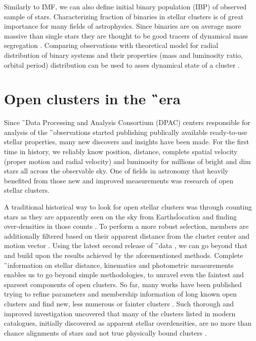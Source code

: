 Similarly to IMF, we can also define initial binary population (IBP) of observed sample of stars. Characterizing fraction of binaries in stellar clusters is of great importance for many fields of astrophysics. Since binaries are on average more massive than single stars they are thought to be good tracers of dynamical mass segregation \cite{2015arXiv151000099D}. Comparing observations with theoretical model for radial distribution of binary systems and their properties (mass and luminosity ratio, orbital period) distribution can be used to asses dynamical state of a cluster \cite{1999NewA....4..495K}.

\section{Open clusters in the \G\ era}
\label{sec:open_clust_gaia}
Since \G\ Data Processing and Analysis Consortium (DPAC) centers responsible for analysis of the \G\ observations started publishing publically available ready-to-use stellar properties, many new discovers and insights have been made. For the first time in history, we reliably know position, distance, complete spatial velocity (proper motion and radial velocity) and luminosity for millions of bright and dim stars all across the observable sky. One of fields in astronomy that heavily benefited from those new and improved measurements was research of open stellar clusters.

A traditional historical way to look for open stellar clusters was through counting stars as they are apparently seen on the sky from Earths\' location and finding over-densities in those counts \cite{1988AJ.....95..108L, 2014A&A...568A..51S}. To perform a more robust selection, members are additionally filtered based on their apparent distance from the cluster center and motion vector \cite{2017A&A...601A..19G}. Using the latest second release of \G\ data \citep[DR2,][]{2018arXiv180409365G}, we can go beyond that and build upon the results achieved by the aforementioned methods. Complete \G\ information on stellar distance, kinematics and photometric measurements enables us to go beyond simple methodologies, to unravel even the faintest and sparsest components of open clusters. So far, many works have been published trying to refine parameters and membership information of long known open clusters \cite{2017A&A...601A..19G, 2018A&A...618A..93C, 2019A&A...627A..35C} and find new, less numerous or fainter clusters \cite{2019arXiv190904612B, 2019ApJS..245...32L, 2019JKAS...52..145S, 2019A&A...624A.126C, 2020arXiv200107122C}. Such thorough and improved investigation uncovered that many of the clusters listed in modern catalogues, initially discovered as apparent stellar overdensities, are no more than chance alignments of stars and not true physically bound clusters \cite{1998A&A...340..402B, 2000A&A...357..145C, 2016AJ....152....7H, 2018MNRAS.480.5242K, 2020A&A...633A..99C}.

